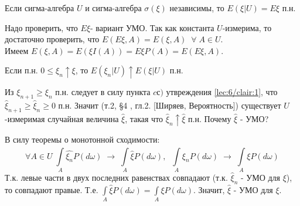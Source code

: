 \begin{clair}\label{lec:6/clair:2}
	Если сигма-алгебра $U$ и сигма-алгебра $\sigma(\xi)$ независимы, то $E(\xi|U) = E\xi$ п.н.
\end{clair}
\begin{Proof}
	Надо проверить, что $E\xi$- вариант УМО. Так как константа $U$-измерима, то достаточно проверить, что $\displaystyle E(E\xi,A) = E(\xi, A)\;\; \forall\;A \in U$. \\
	Имеем $\displaystyle E(\xi, A) = E(\xi I(A)) = E\xi P(A) = E(E\xi,A)$.
\end{Proof}

\begin{clair}\label{lec:6/clair:3}
	Если п.н. $0\leq \xi_n \uparrow \xi$, то $E(\xi_n|U) \uparrow E(\xi|U)$ п.н.
\end{clair}
\begin{Proof}
	Из $\xi_{n+1} \geq \xi_n$ п.н. следует в силу пункта $ cс)$ утвреждения \ref{lec:6/clair:1}, что $\hat{\xi}_{n+1} \geq \hat{\xi}_n \geq 0$ п.н. Значит (т.2, §4 , гл.2. [Ширяев, Вероятность]) существует $U$-измеримая случайная величина $\hat{\xi}$, такая что $\hat{\xi}_n \uparrow \hat{\xi}$ п.н. 
	Почему $\hat{\xi}$ - УМО?

	В силу теоремы о монотонной сходимости:
	$$\forall A \in U \; \int\limits^{}_{A}\hat{\xi_n}P(d\omega)\;\rightarrow\;\int\limits^{}_{A}\hat{\xi}P(d\omega), \;\;\int\limits^{}_{A}\xi_nP(d\omega)\;\rightarrow\;\int\limits^{}_{A}\xi P(d\omega)$$
	Т.к. левые части в двух последних равенствах совпадают (т.к. $\hat{\xi}_n$ - УМО для $\xi$), то совпадают правые. Т.е. $\displaystyle \int\limits^{}_{A}\hat{\xi}P(d\omega)=\int\limits^{}_{A}\xi P(d\omega)$.
	Значит, $\hat{\xi}$ - УМО для $\xi$.
\end{Proof}

